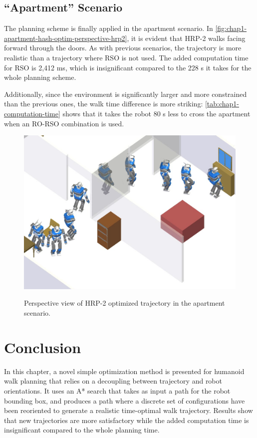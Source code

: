 \subsection{``Apartment'' Scenario}
The planning scheme is finally applied in the apartment
scenario. In \autoref{fig:chap1-apartment-hash-optim-perspective-hrp2}, it
is evident that HRP-2 walks facing forward through the doors. As with
previous scenarios, the trajectory is more realistic than a trajectory
where RSO is not used. The added computation time for RSO is 2,412 ms,
which is insignificant compared to the 228 s it takes for the whole
planning scheme.

Additionally, since the environment is significantly larger and more
constrained than the previous ones, the walk time difference is more
striking: \autoref{tab:chap1-computation-time} shows that it takes the robot
80 s less to cross the apartment when an RO-RSO combination is used.

\begin{figure}
  \centering
      {\includegraphics[width = \linewidth]
        {src/chap1-path-optimization/apartment-hash-optim-perspective-hrp2.png}}
      \caption{Perspective view of HRP-2 optimized trajectory in the
        apartment scenario.}
      \label{fig:chap1-apartment-hash-optim-perspective-hrp2}
\end{figure}

\section{Conclusion}
In this chapter, a novel simple optimization method is
presented for humanoid walk planning that relies on a decoupling
between trajectory and robot orientations. It uses an A* search that
takes as input a path for the robot bounding box, and produces a path
where a discrete set of configurations have been reoriented to generate
a realistic time-optimal walk trajectory. Results show that new
trajectories are more satisfactory while the added computation time is
insignificant compared to the whole planning time.

